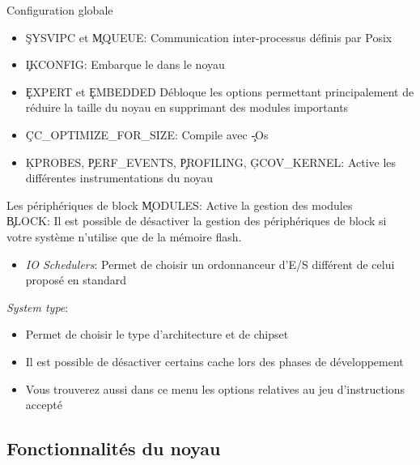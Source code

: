 \begin{frame}[fragile=singleslide]{Configuration globale}
  \begin{itemize}
  \item  \c{SYSVIPC} et  \c{MQUEUE}:  Communication inter-processus
    définis par Posix
  \item \c{IKCONFIG}: Embarque le  dans le noyau
  \item  \c{EXPERT} et  \c{EMBEDDED} Débloque  les  options permettant
    principalement  de réduire la  taille du  noyau en  supprimant des
    modules importants
  \item \c{CC_OPTIMIZE_FOR_SIZE}: Compile avec \c{-Os}
  \item \c{KPROBES},  \c{PERF_EVENTS}, \c{PROFILING}, \c{GCOV_KERNEL}:
    Active les différentes instrumentations du noyau
  \end{itemize}
\end{frame}

\begin{frame}[fragile=singleslide]{Les périphériques de block}
  \c{MODULES}: Active la gestion des modules
  \\[2ex]
  \c{BLOCK}: Il est possible  de désactiver la gestion des périphériques
  de block si votre système n'utilise que de la mémoire flash.
  \begin{itemize}
  \item \emph{IO  Schedulers}: Permet de choisir  un ordonnanceur d'E/S
    différent de celui proposé en standard
  \end{itemize}
  \emph{System type}:
  \begin{itemize}
  \item Permet de choisir le type d'architecture et de chipset
  \item Il est  possible de désactiver certains cache  lors des phases
    de développement
  \item Vous trouverez aussi dans  ce menu les options relatives au jeu
    d'instructions accepté
  \end{itemize}
\end{frame}

\subsection{Fonctionnalités du noyau}

